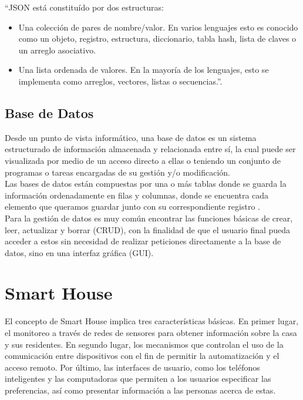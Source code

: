 ``JSON está constituído por dos estructuras:

\begin{itemize}
	\item Una colección de pares de nombre/valor. En varios lenguajes esto es conocido como un objeto, registro, estructura, diccionario, tabla hash, lista de claves o un arreglo asociativo.
	\item Una lista ordenada de valores. En la mayoría de los lenguajes, esto se implementa como arreglos, vectores, listas o secuencias.''\cite{JSON}.
\end{itemize}


\subsection{Base de Datos}

Desde un punto de vista informático, una base de datos es un sistema estructurado de información almacenada y relacionada entre sí, la cual puede ser visualizada por medio de un acceso directo a ellas o teniendo un conjunto de programas o tareas encargadas de su gestión y/o modificación.\\

Las bases de datos están compuestas por una o más tablas donde se guarda la información ordenadamente en filas y columnas, donde se encuentra cada elemento que queramos guardar junto con su correspondiente registro \cite{DB}.\\ 

Para la gestión de datos es muy común encontrar las funciones básicas de crear, leer, actualizar y borrar (CRUD), con la finalidad de que el usuario final pueda acceder a estos sin necesidad de realizar peticiones directamente a la base de datos, sino en una interfaz gráfica (GUI).\\

\section{Smart House}

El concepto de Smart House implica tres características básicas. En primer lugar, el monitoreo a través de redes de sensores para obtener información sobre la casa y sus residentes. En segundo lugar, los mecanismos que controlan el uso de la comunicación entre dispositivos con el fin de permitir la automatización y el acceso remoto. Por último, las interfaces de usuario, como los teléfonos inteligentes y las computadoras que permiten a los usuarios especificar las preferencias, así como presentar información a las personas acerca de estas. \\

